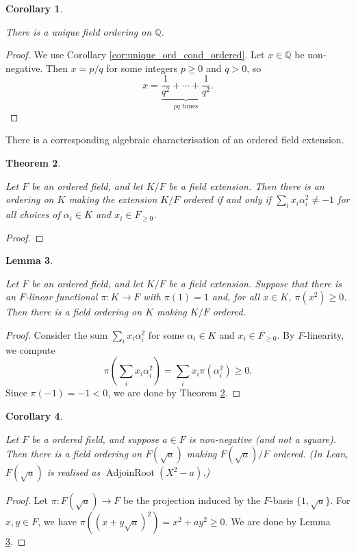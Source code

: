 \documentclass{article}
\newtheorem{theorem}{Theorem}[section]
\newtheorem{lemma}[theorem]{Lemma}
\newtheorem{corollary}[theorem]{Corollary}
\newcommand{\Q}{\mathbb{Q}}
\newcommand{\leanok}{}
\newcommand{\lean}[1]{}
\newcommand{\uses}[1]{}
\begin{document}
\begin{corollary}
  \label{cor:unique_ord_Q}
  \lean{Rat.existsUnique_isStrictOrderedRing}
  \leanok
  There is a unique field ordering on $\Q$.
\end{corollary}
\begin{proof}
  \uses{cor:unique_ord_cond_ordered}
  \leanok
  We use Corollary \ref{cor:unique_ord_cond_ordered}. Let $x\in\Q$ be non-negative. Then $x=p/q$ for some integers $p\geq0$ and $q>0$, so
  \[x=\underbrace{\frac{1}{q^2}+\cdots+\frac{1}{q^2}}_{pq\text{ times}}.\]
\end{proof}

There is a corresponding algebraic characterisation of an ordered field extension.

\begin{theorem}
  \label{thm:ext_ord_cond}
  \lean{Field.exists_isOrderedAlgebra_iff_neg_one_notMem_span_nonneg_isSquare}
  \leanok
  Let $F$ be an ordered field, and let $K/F$ be a field extension. Then there is an ordering on $K$ making the extension $K/F$ ordered if and only if $\sum_i x_i\alpha_i^2\neq-1$ for all choices of $\alpha_i\in K$ and $x_i\in F_{\geq0}$.
\end{theorem}
\begin{proof}
  \leanok
\end{proof}

\begin{lemma}
  \label{lem:ext_ord_functional_suff}
  \lean{IsRealClosed.exists_isOrderedAlgebra_of_linearFunctional}
  \leanok
  Let $F$ be an ordered field, and let $K/F$ be a field extension. Suppose that there is an $F$-linear functional $\pi:K\to F$ with $\pi(1)=1$ and, for all $x\in K$, $\pi(x^2)\geq0$. Then there is a field ordering on $K$ making $K/F$ ordered.
\end{lemma}
\begin{proof}
  \uses{thm:ext_ord_cond}
  \leanok
  Consider the sum $\sum_i x_i\alpha_i^2$ for some $\alpha_i\in K$ and $x_i\in F_{\geq0}$. By $F$-linearity, we compute
  \[\pi\left(\sum_i x_i\alpha_i^2\right)=\sum_i x_i\pi(\alpha_i^2)\geq0.\]
  Since $\pi(-1)=-1<0$, we are done by Theorem \ref{thm:ext_ord_cond}.
\end{proof}

\begin{corollary}
  \label{cor:ext_ord_to_adj_sqrt}
  \lean{IsRealClosed.exists_ordered_algebra_adjoinRoot_sq_sub_C}
  \leanok
  Let $F$ be a ordered field, and suppose $a\in F$ is non-negative (and not a square). Then there is a field ordering on $F(\sqrt{a})$ making $F(\sqrt{a})/F$ ordered. (In Lean, $F(\sqrt{a})$ is realised as $\operatorname{AdjoinRoot}(X^2-a)$.)
\end{corollary}
\begin{proof}
  \uses{lem:ext_ord_functional_suff}
  \leanok
  Let $\pi:F(\sqrt{a})\to F$ be the projection induced by the $F$-basis $\{1,\sqrt{a}\}$. For $x,y\in F$, we have $\pi((x+y\sqrt{a})^2)=x^2+ay^2\geq0$. We are done by Lemma \ref{lem:ext_ord_functional_suff}.
\end{proof}
\end{document}
